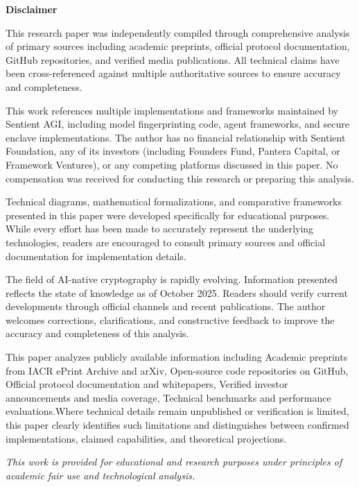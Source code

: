 \documentclass[12pt,a4paper]{article}
\begin{document}
\newpage
\thispagestyle{plain}
\vspace*{2cm}

\begin{center}
\textbf{\Large Disclaimer}
\end{center}

\vspace{1cm}

\noindent
This research paper was independently compiled through comprehensive analysis of primary sources including academic preprints, official protocol documentation, GitHub repositories, and verified media publications. All technical claims have been cross-referenced against multiple authoritative sources to ensure accuracy and completeness.

\vspace{0.5cm}

\noindent
This work references multiple implementations and frameworks maintained by Sentient AGI, including model fingerprinting code, agent frameworks, and secure enclave implementations. The author has no financial relationship with Sentient Foundation, any of its investors (including Founders Fund, Pantera Capital, or Framework Ventures), or any competing platforms discussed in this paper. No compensation was received for conducting this research or preparing this analysis.

\vspace{0.5cm}

\noindent
Technical diagrams, mathematical formalizations, and comparative frameworks presented in this paper were developed specifically for educational purposes. While every effort has been made to accurately represent the underlying technologies, readers are encouraged to consult primary sources and official documentation for implementation details.

\vspace{0.5cm}

\noindent
The field of AI-native cryptography is rapidly evolving. Information presented reflects the state of knowledge as of October 2025. Readers should verify current developments through official channels and recent publications. The author welcomes corrections, clarifications, and constructive feedback to improve the accuracy and completeness of this analysis.

\vspace{0.5cm}

\noindent
This paper analyzes publicly available information including Academic preprints from IACR ePrint Archive and arXiv, Open-source code repositories on GitHub, Official protocol documentation and whitepapers, Verified investor announcements and media coverage, Technical benchmarks and performance evaluations.Where technical details remain unpublished or verification is limited, this paper clearly identifies such limitations and distinguishes between confirmed implementations, claimed capabilities, and theoretical projections.


\vspace{1.5cm}

\begin{center}
\textit{This work is provided for educational and research purposes under principles of academic fair use and technological analysis.}
\end{center}
\end{document}
